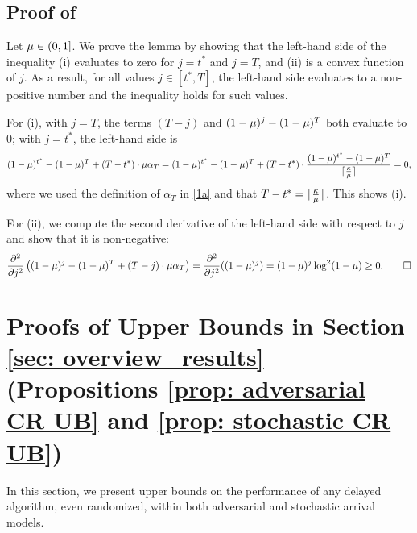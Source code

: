 \subsection{Proof of }
\label{proof: AdvTheoremNegativeBeta}
Let $\mu \in (0,1]$. We prove the lemma by showing that the left-hand side of the inequality (i) evaluates to zero for $j = t^*$ and $j = T$, and (ii) is a convex function of $j$. As a result, for all values $j\in[t^*,T]$, the left-hand side evaluates to a non-positive number and the inequality holds for such values.  
  
For (i), with $j=T$, the terms $(T-j)$ and $(1-\mu)^j-(1-\mu)^T$ both evaluate to 0; with  $j=t^*$, the left-hand side is
  \begin{equation*}
      (1-\mu)^{t^*} - (1-\mu)^T + (T-t^*) \cdot \mu \alpha_T = (1-\mu)^{t^*} - (1-\mu)^T + (T-t^*) \cdot \frac{(1-\mu)^{t^*} - (1-\mu)^T}{\lceil \frac{\kappa}{\mu} \rceil} = 0,
  \end{equation*}
  where we used the definition of $\alpha_T$ in \eqref{1a} and that $T-t^* = \lceil \frac{\kappa}{\mu} \rceil$. This shows (i). 
  
  For (ii), we compute the second derivative of the left-hand side with respect to $j$ and show that it is non-negative: 
  \begin{equation*}
      \frac{\partial^2}{\partial j^2} \left( (1-\prob)^j - (1-\prob)^T + (T-j) \cdot \mu \alpha_T \right) = \frac{\partial^2}{\partial j^2} ((1-\prob)^j) = (1-\prob)^j \log^2 (1-\prob) \geq 0.\hfill\Halmos
  \end{equation*}

\section{Proofs of Upper Bounds in Section \ref{sec: overview_results} (Propositions \ref{prop: adversarial CR UB} and \ref{prop: stochastic CR UB})}
\label{section: impossibility}
 In this section, we present upper bounds on the performance of any delayed algorithm, even randomized, within both adversarial and stochastic arrival models. 
 
